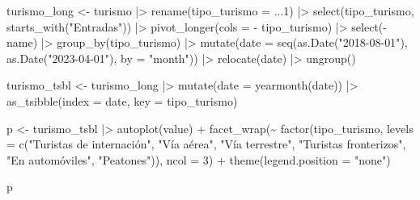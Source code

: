 \documentclass[
  letterpaper,
  DIV=11,
  numbers=noendperiod]{scrartcl}
\newenvironment{Shaded}{}{}
\newcommand{\AttributeTok}[1]{\textcolor[rgb]{0.65,0.15,0.64}{#1}}
\newcommand{\DecValTok}[1]{\textcolor[rgb]{0.60,0.41,0.00}{#1}}
\newcommand{\FunctionTok}[1]{\textcolor[rgb]{0.25,0.47,0.95}{#1}}
\newcommand{\NormalTok}[1]{\textcolor[rgb]{0.22,0.23,0.26}{#1}}
\newcommand{\OtherTok}[1]{\textcolor[rgb]{0.15,0.68,0.38}{#1}}
\newcommand{\SpecialCharTok}[1]{\textcolor[rgb]{0.00,0.52,0.74}{#1}}
\newcommand{\StringTok}[1]{\textcolor[rgb]{0.31,0.63,0.31}{#1}}
\begin{document}
\begin{Shaded}
\begin{Highlighting}[]
\NormalTok{turismo\_long }\OtherTok{\textless{}{-}}\NormalTok{ turismo }\SpecialCharTok{|\textgreater{}} 
  \FunctionTok{rename}\NormalTok{(}\AttributeTok{tipo\_turismo =}\NormalTok{ ...}\DecValTok{1}\NormalTok{) }\SpecialCharTok{|\textgreater{}} 
  \FunctionTok{select}\NormalTok{(tipo\_turismo, }\FunctionTok{starts\_with}\NormalTok{(}\StringTok{"Entradas"}\NormalTok{)) }\SpecialCharTok{|\textgreater{}} 
  \FunctionTok{pivot\_longer}\NormalTok{(}\AttributeTok{cols =} \SpecialCharTok{{-}}\NormalTok{ tipo\_turismo) }\SpecialCharTok{|\textgreater{}} 
  \FunctionTok{select}\NormalTok{(}\SpecialCharTok{{-}}\NormalTok{name) }\SpecialCharTok{|\textgreater{}} 
  \FunctionTok{group\_by}\NormalTok{(tipo\_turismo) }\SpecialCharTok{|\textgreater{}} 
  \FunctionTok{mutate}\NormalTok{(}\AttributeTok{date =} \FunctionTok{seq}\NormalTok{(}\FunctionTok{as.Date}\NormalTok{(}\StringTok{"2018{-}08{-}01"}\NormalTok{), }\FunctionTok{as.Date}\NormalTok{(}\StringTok{"2023{-}04{-}01"}\NormalTok{), }\AttributeTok{by =} \StringTok{"month"}\NormalTok{)) }\SpecialCharTok{|\textgreater{}} 
  \FunctionTok{relocate}\NormalTok{(date) }\SpecialCharTok{|\textgreater{}} 
  \FunctionTok{ungroup}\NormalTok{()}
\end{Highlighting}
\end{Shaded}

\begin{Shaded}
\begin{Highlighting}[]
\NormalTok{turismo\_tsbl }\OtherTok{\textless{}{-}}\NormalTok{ turismo\_long }\SpecialCharTok{|\textgreater{}} 
  \FunctionTok{mutate}\NormalTok{(}\AttributeTok{date =} \FunctionTok{yearmonth}\NormalTok{(date)) }\SpecialCharTok{|\textgreater{}} 
  \FunctionTok{as\_tsibble}\NormalTok{(}\AttributeTok{index =}\NormalTok{ date, }\AttributeTok{key =}\NormalTok{ tipo\_turismo)}
\end{Highlighting}
\end{Shaded}

\begin{Shaded}
\begin{Highlighting}[]
\NormalTok{p }\OtherTok{\textless{}{-}}\NormalTok{ turismo\_tsbl }\SpecialCharTok{|\textgreater{}} 
  \FunctionTok{autoplot}\NormalTok{(value) }\SpecialCharTok{+}
  \FunctionTok{facet\_wrap}\NormalTok{(}\SpecialCharTok{\textasciitilde{}} \FunctionTok{factor}\NormalTok{(tipo\_turismo, }\AttributeTok{levels =} \FunctionTok{c}\NormalTok{(}\StringTok{"Turistas de internación"}\NormalTok{, }\StringTok{"Vía aérea"}\NormalTok{, }\StringTok{"Vía terrestre"}\NormalTok{, }
                                               \StringTok{"Turistas fronterizos"}\NormalTok{, }\StringTok{"En automóviles"}\NormalTok{, }\StringTok{"Peatones"}\NormalTok{)), }\AttributeTok{ncol =} \DecValTok{3}\NormalTok{) }\SpecialCharTok{+}
  \FunctionTok{theme}\NormalTok{(}\AttributeTok{legend.position =} \StringTok{"none"}\NormalTok{)}

\NormalTok{p}
\end{Highlighting}
\end{Shaded}
\end{document}
